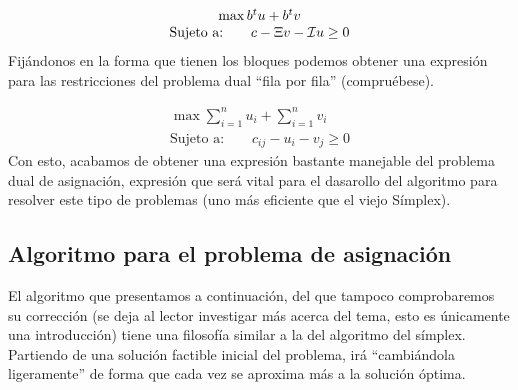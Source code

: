 \begin{equation*}
	\begin{array}{c}
		\max b^tu+b^tv\\
		\text{Sujeto a:}\qquad c-\Xi v-\mathcal{I}u\geq 0
	\end{array}
\end{equation*}
Fijándonos en la forma que tienen los bloques podemos obtener una expresión para las restricciones del problema dual ``fila por fila'' (compruébese).

\begin{equation*}
	\begin{array}{c}
		\max \sum_{i=1}^{n}u_i+\sum_{i=1}^{n}v_i\\
		\text{Sujeto a:}\qquad c_{ij}-u_i-v_j\geq 0
	\end{array}
\end{equation*}
Con esto, acabamos de obtener una expresión bastante manejable del problema dual de asignación, expresión que será vital para el dasarollo del algoritmo para resolver este tipo de problemas (uno más eficiente que el viejo Símplex).
\subsection{Algoritmo para el problema de asignación}
El algoritmo que presentamos a continuación, del que tampoco comprobaremos su corrección (se deja al lector investigar más acerca del tema, esto es únicamente una introducción) tiene una filosofía similar a la del algoritmo del símplex. Partiendo de una solución factible inicial del problema, irá ``cambiándola ligeramente'' de forma que cada vez se aproxima más a la solución óptima.

